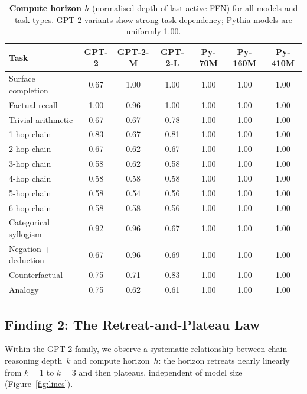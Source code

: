 \documentclass{article}
\begin{document}
\begin{table}[t]
\centering
\caption{%
  \textbf{Compute horizon $h$} (normalised depth of last active FFN)
  for all models and task types.
  GPT-2 variants show strong task-dependency; Pythia models are
  uniformly 1.00.
}
\label{tab:pivot_horizon}
\small
\setlength\tabcolsep{5pt}
\begin{tabular}{lcccccc}
\toprule
\textbf{Task} & \textbf{GPT-2} & \textbf{GPT-2-M} & \textbf{GPT-2-L}
              & \textbf{Py-70M} & \textbf{Py-160M} & \textbf{Py-410M} \\
\midrule
Surface completion     & 0.67 & 1.00 & 1.00 & 1.00 & 1.00 & 1.00 \\
Factual recall         & 1.00 & 0.96 & 1.00 & 1.00 & 1.00 & 1.00 \\
Trivial arithmetic     & 0.67 & 0.67 & 0.78 & 1.00 & 1.00 & 1.00 \\
1-hop chain            & 0.83 & 0.67 & 0.81 & 1.00 & 1.00 & 1.00 \\
2-hop chain            & 0.67 & 0.62 & 0.67 & 1.00 & 1.00 & 1.00 \\
3-hop chain            & 0.58 & 0.62 & 0.58 & 1.00 & 1.00 & 1.00 \\
4-hop chain            & 0.58 & 0.58 & 0.58 & 1.00 & 1.00 & 1.00 \\
5-hop chain            & 0.58 & 0.54 & 0.56 & 1.00 & 1.00 & 1.00 \\
6-hop chain            & 0.58 & 0.58 & 0.56 & 1.00 & 1.00 & 1.00 \\
Categorical syllogism  & 0.92 & 0.96 & 0.67 & 1.00 & 1.00 & 1.00 \\
Negation + deduction   & 0.67 & 0.96 & 0.69 & 1.00 & 1.00 & 1.00 \\
Counterfactual         & 0.75 & 0.71 & 0.83 & 1.00 & 1.00 & 1.00 \\
Analogy                & 0.75 & 0.62 & 0.61 & 1.00 & 1.00 & 1.00 \\
\bottomrule
\end{tabular}
\end{table}


\subsection{Finding 2: The Retreat-and-Plateau Law}

Within the GPT-2 family, we observe a systematic relationship between
chain-reasoning depth~$k$ and compute horizon~$h$:
the horizon retreats nearly linearly from $k=1$ to $k=3$ and then
plateaus, independent of model size (Figure~\ref{fig:lines}).
\end{document}
